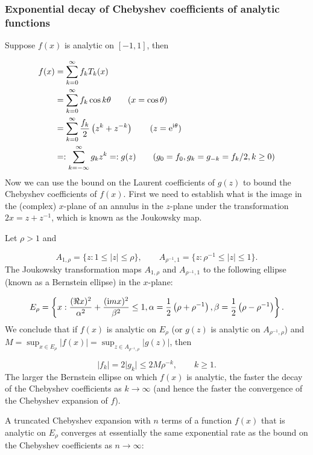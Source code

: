 \documentclass[12pt,a4paper]{article}
\begin{document}
\subsubsection{Exponential decay of Chebyshev coefficients of analytic functions}
Suppose $f(x)$ is analytic on $[-1, 1]$, then


\begin{align*}
f(x) & = \sum_{k = 0}^{\infty} f_k T_k(x) \\
     & =\sum_{k = 0}^{\infty} f_k \cos k\theta \qquad (x = \cos\theta) \\
     & = \sum_{k = 0}^{\infty} {f_k \over 2}\left( z^k + z^{-k}\right)  \qquad (z = {\rm e}^{{\rm i} \theta}) \\
     & =: \sum_{k = -\infty}^{\infty} g_k z^{k} =: g(z) \qquad (g_0 = f_0, g_{k} = g_{-k} = f_k/2, k\geq 0)
\end{align*}
Now we can use the bound on the Laurent coefficients of $g(z)$ to bound the Chebyshev coefficients of $f(x)$. First we need to establish what is the image in the (complex) $x$-plane of an annulus in the $z$-plane under the transformation $2x = z + z^{-1}$, which is known as the Joukowsky map.

Let $\rho > 1$ and

\[
A_{1,\rho} =  \lbrace z : 1 \leq \vert z \vert \leq \rho \rbrace, \qquad  A_{\rho^{-1},1} =  \lbrace z : \rho^{-1} \leq \vert z \vert \leq 1 \rbrace.
\]
The Joukowsky transformation maps $A_{1,\rho}$ and $A_{\rho^{-1},1}$ to the following ellipse (known as a Bernstein ellipse) in the $x$-plane:

\[
E_{\rho} = \left\lbrace x : {(\Re x)^2 \over \alpha^2} + {({\rm i}m x)^2 \over \beta^2} \leq 1, \alpha = {1 \over 2}\left( \rho + \rho^{-1} \right),   \beta = {1 \over 2}\left( \rho - \rho^{-1} \right) \right\rbrace.
\]
We conclude that if $f(x)$ is analytic on $E_{\rho}$ (or $g(z)$ is analytic on $A_{\rho^{-1},\rho}$) and $M = \sup_{x \in  E_{\rho}} |f(x)| = \sup_{z \in  A_{\rho^{-1},\rho}} |g(z)|$, then

\[
\vert f_k \vert = 2 \vert g_k \vert \leq 2M\rho^{-k}, \qquad k \geq 1.
\]
The larger the Bernstein ellipse on which $f(x)$ is analytic, the faster the decay of the Chebyshev coefficients as $k \to \infty$ (and hence the faster the convergence of the Chebyshev expansion of $f$).

A truncated Chebyshev expansion with $n$ terms of a function $f(x)$ that is analytic on $E_{\rho}$ converges at essentially the same exponential rate as the bound on the Chebyshev coefficients as $n \to \infty$:
\end{document}
